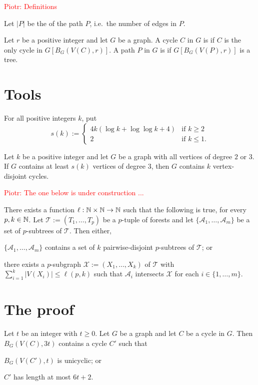 \documentclass{patmorin}
\newcommand{\piotr}[1]{\textcolor{red}{Piotr: #1}}
\begin{document}
\piotr{Definitions}

Let $|P|$ be the  of the path $P$, i.e.\ the number of edges in $P$.

Let $r$ be a positive integer and let $G$ be a graph.
A cycle $C$ in $G$ is 
if $C$ is the only cycle in $G[B_G(V(C),r)]$.  A path $P$ in $G$ is  if $G[B_G(V(P),r)]$ is a tree.

\section{Tools}
For all positive integers $k$, put
\[
s(k):=\begin{cases}
4k(\log k + \log\log k +4)&\textrm{if $k\geq2$}\\
2&\textrm{if $k\leq1$.}
\end{cases}
\]
\begin{thm}
\label{thm:simonovits}
Let $k$ be a positive integer and
let $G$ be a graph with all vertices of degree $2$ or $3$.
If $G$ contains at least $s(k)$ vertices of degree $3$, then
$G$ contains $k$ vertex-disjoint cycles.
\end{thm}

\piotr{The one below is under construction ...}
\begin{thm}\label{thm:gyarfas-lehel}
   There exists a function $\ell:\mathbb{N}\times\mathbb{N}\to\mathbb{N}$ such that the following is true, for every $p,k\in\mathbb{N}$.
   Let $\mathcal{T}:=(T_1,\ldots,T_p)$ be a $p$-tuple of forests and let $\{\mathcal{A}_1,\ldots,\mathcal{A}_m\}$ be a set of $p$-subtrees of $\mathcal{T}$. Then either,
   \begin{compactenum}[(a)]
     \item $\{\mathcal{A}_1,\ldots,\mathcal{A}_m\}$ contains a set of $k$ pairwise-disjoint $p$-subtrees of $\mathcal{T}$; or
     \item there exists a $p$-subgraph $\mathcal{X}:=(X_1,\ldots,X_k)$ of $\mathcal{T}$ with $\sum_{i=1}^k|V(X_i)|\le \ell(p,k)$ such that $\mathcal{A}_i$ intersects $\mathcal{X}$ for each $i\in\{1,\ldots,m\}$.
   \end{compactenum}
\end{thm}


\section{The proof}

\begin{lem}\label{short_or_unicycle_nearby}
  Let $t$ be an integer with $t\ge 0$.
  Let $G$ be a graph and let $C$ be a cycle in $G$.
  Then $B_G(V(C),3t)$ contains a cycle $C'$ such that
  \begin{compactenum}[(a)]
    \item $B_G(V(C'),t)$ is unicyclic; or\label{short_or_unicycle_nearby:unicyclic}
    \item $C'$ has length at most $6t+2$.\label{short_or_unicycle_nearby:short}
  \end{compactenum}
\end{lem}
\end{document}

